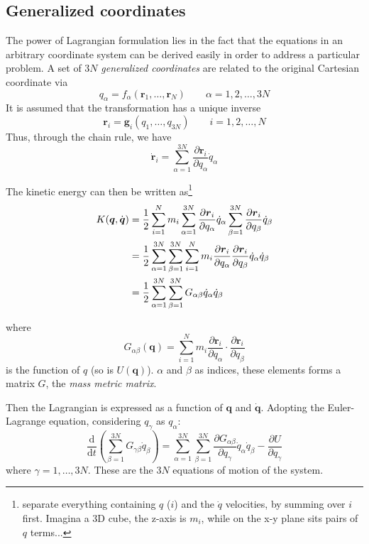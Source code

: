 \documentclass[
  10pt,
  twoside,
  openany,
  b5paper, %
  colorscheme = bootstrap-v4, %
]{qyxf-book}
\numberwithin{equation}{section}
\newcommand{\md}{\mathrm{d}}
\newcommand{\der}[2]{\dfrac{\md #1}{\md #2}}
\newcommand{\p}[2]{\dfrac{\partial #1}{\partial #2}}
\newcommand{\vr}{\boldsymbol{r}}
\newcommand{\vq}{\boldsymbol{q}}
\newcommand{\dvr}{\dot{\vr}}
\newcommand{\dvq}{\dot{\vq}}
\newcommand{\half}{\dfrac{1}{2}}
\newcommand{\sumin}{\sum_{i=1}^N}
\newcommand{\suman}{\sum_{\alpha=1}^{3N}}
\begin{document}
\subsection{Generalized coordinates}
The power of Lagrangian formulation lies in the fact that the equations in an arbitrary coordinate system can be derived easily in order to address a particular problem. A set of $3N$ \textit{generalized coordinates} are related to the original Cartesian coordinate via
\begin{equation}
	q_\alpha = f_\alpha(\vr_1,\dots,\vr_N)\qquad \alpha=1,2,\dots,3N
\end{equation}
It is assumed that the transformation has a unique inverse
\begin{equation}
	\vr_i=\boldsymbol{g}_i(q_1,\dots,q_{3N})\qquad i=1,2,\dots,N
\end{equation}
Thus, through the chain rule, we have
\begin{equation}
	\dvr_i=\suman\p{\vr_i}{q_\alpha}\dot{q}_\alpha
\end{equation}

The kinetic energy can then be written as\footnote{separate everything containing $q$ ($i$) and the $\dot{q}$ velocities, by summing over $i$ first. Imagina a 3D cube, the z-axis is $m_i$, while on the x-y plane sits pairs of $q$ terms...}
\begin{align}\label{eq:kinetic-energy}
	K(\vq,\dvq)&=\half\sumin m_i\suman\p{\vr_i}{q_\alpha}\dot{q}_\alpha\sum_{\beta=1}^{3N}\p{\vr_i}{q_\beta}\dot{q}_\beta \notag\\
	&=\half\suman\sum_{\beta=1}^{3N}\sumin m_i\p{\vr_i}{q_\alpha}\p{\vr_i}{q_\beta}\dot{q}_\alpha\dot{q}_\beta \notag\\
	&=\half\suman\sum_{\beta=1}^{3N}G_{\alpha\beta}\dot{q}_\alpha\dot{q}_\beta
\end{align}
\begin{tcolorbox}
	where
	\begin{equation}
		G_{\alpha\beta}(\vq)=\sumin m_i\p{\vr_i}{q_\alpha}\cdot\p{\vr_i}{q_\beta}
	\end{equation}
	is the function of $q$ (so is $U(\vq)$). $\alpha$ and $\beta$ as indices, these elements forms a matrix $G$, the \textit{mass metric matrix}. 
\end{tcolorbox}
Then the Lagrangian is expressed as a function of $\vq$ and $\dvq$. Adopting the Euler-Lagrange equation, considering $q_{\gamma}$ as $q_\alpha$:
\begin{equation}
	\der{}{t}\left(\sum_{\beta=1}^{3N}G_{\gamma\beta}\dot{q}_\beta\right)=\suman\sum_{\beta=1}^{3N}\p{G_{\alpha\beta}}{q_\gamma}\dot{q}_\alpha\dot{q}_\beta-\p{U}{q_\gamma} \label{eq:lag-equations}
\end{equation}
where $\gamma=1,\dots,3N$. These are the $3N$ equations of motion of the system.
\end{document}
